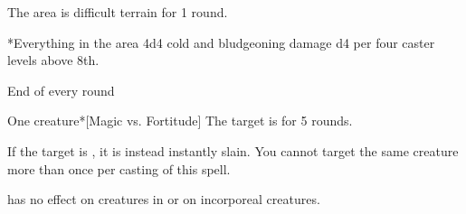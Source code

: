 \begin{spellheader}
    \spellrng{\rngmed}
\end{spellheader}
\begin{spelleffects}
    \spellline
    \spelleffect The area is difficult terrain for 1 round.
    \begin{spelltargets}*{Everything in the area}
        \spellsuccess 4d4 cold and bludgeoning damage \add d4 per four caster levels above 8th.
    \end{spelltargets}
\end{spelleffects}
\begin{spellfooter}
    \spellnotes \destructivespellnotes
\end{spellfooter}

\begin{spellheader}
    \spellrng{\rngclose}
\end{spellheader}
\begin{spelleffects}
    \spellline
    \begin{spelltrigger}{End of every round}
        \begin{spelltarget}{One creature}*[Magic vs. Fortitude]
            \spellsuccess The target is \staggered for 5 rounds.

            If the target is \bloodied, it is instead instantly slain.
            \spellspecial You cannot target the same creature more than once per casting of this spell.
        \end{spelltarget}
    \end{spelltrigger}
\end{spelleffects}
\begin{spellfooter}
    \spellnotes {} has no effect on creatures in  or on incorporeal creatures.
\end{spellfooter}

